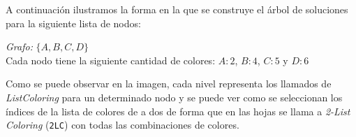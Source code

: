 A continuación ilustramos la forma en la que se construye el árbol de soluciones para la siguiente lista de nodos:

\begin{center}
\emph{Grafo:} $\{ A, B, C, D \}$\\
Cada nodo tiene la siguiente cantidad de colores: $A: 2$, $B:4$, $C:5$ y $D:6$
\end{center}

\begin{center}
\end{center}

Como se puede observar en la imagen, cada nivel representa los llamados de \emph{ListColoring} para un determinado nodo y se puede ver como se seleccionan los índices de la lista de colores de a dos de forma que en las hojas se llama a \emph{2-List Coloring} (\texttt{2LC}) con todas las combinaciones de colores.

\newpage
